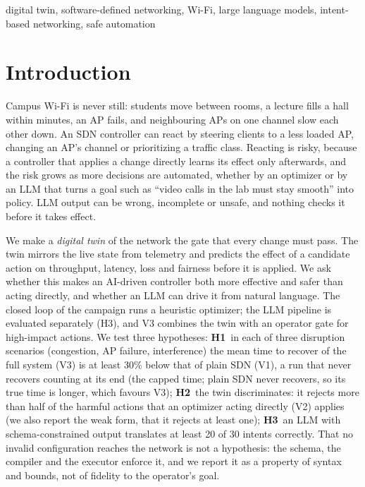 \documentclass[conference]{IEEEtran}
\begin{document}
\begin{IEEEkeywords}
digital twin, software-defined networking, Wi-Fi, large language models, intent-based networking, safe automation
\end{IEEEkeywords}

\section{Introduction}
Campus Wi-Fi is never still: students move between rooms, a lecture fills a hall within minutes, an AP fails, and neighbouring APs on one channel slow each other down. An SDN controller can react by steering clients to a less loaded AP, changing an AP's channel or prioritizing a traffic class. Reacting is risky, because a controller that applies a change directly learns its effect only afterwards, and the risk grows as more decisions are automated, whether by an optimizer or by an LLM that turns a goal such as ``video calls in the lab must stay smooth'' into policy. LLM output can be wrong, incomplete or unsafe, and nothing checks it before it takes effect.

We make a \emph{digital twin} of the network the gate that every change must pass. The twin mirrors the live state from telemetry and predicts the effect of a candidate action on throughput, latency, loss and fairness before it is applied. We ask whether this makes an AI-driven controller both more effective and safer than acting directly, and whether an LLM can drive it from natural language. The closed loop of the campaign runs a heuristic optimizer; the LLM pipeline is evaluated separately (H3), and V3 combines the twin with an operator gate for high-impact actions. We test three hypotheses:
\textbf{H1}~in each of three disruption scenarios (congestion, AP failure, interference) the mean time to recover of the full system (V3) is at least 30\% below that of plain SDN (V1), a run that never recovers counting at its end (the capped time; plain SDN never recovers, so its true time is longer, which favours V3);
\textbf{H2}~the twin discriminates: it rejects more than half of the harmful actions that an optimizer acting directly (V2) applies (we also report the weak form, that it rejects at least one);
\textbf{H3}~an LLM with schema-constrained output translates at least 20 of 30 intents correctly. That no invalid configuration reaches the network is not a hypothesis: the schema, the compiler and the executor enforce it, and we report it as a property of syntax and bounds, not of fidelity to the operator's goal.
\end{document}
